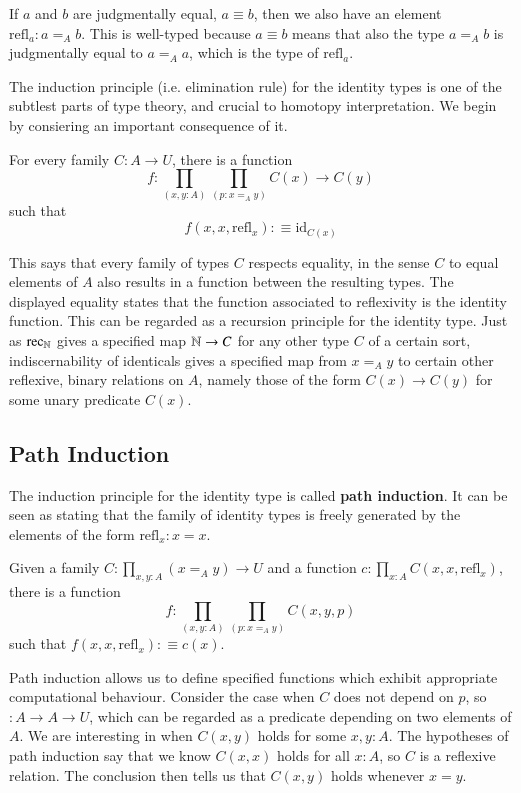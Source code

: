 If $a$ and $b$ are judgmentally equal, $a \equiv b$, then we also have an element $\text{refl}_a: a=_Ab$. This is well-typed because $a \equiv b$ means that also the type $a =_A b$ is judgmentally equal to $a =_Aa$, which is the type of $\text{refl}_a$.

The induction principle (i.e. elimination rule) for the identity types is one of the subtlest parts of type theory, and crucial to homotopy interpretation. We begin by consiering an important consequence of it.

\begin{theorem}
    For every family $C:A\rightarrow U$, there is a function $$f:\prod_{(x,y:A)}\prod_{(p:x=_Ay)}C(x)\rightarrow C(y)$$
    such that $$f(x,x,\text{refl}_x) :\equiv \text{id}_{C(x)}$$
\end{theorem}

This says that every family of types $C$ respects equality, in the sense $C$ to equal elements of $A$ also results in a function between the resulting types. The displayed equality states that the function associated to reflexivity is the identity function. This can be regarded as a recursion principle for the identity type. Just as $\text{rec}_{\mathbb N}$ gives a specified map $\mathbb N\rightarrow C$ for any other type $C$ of a certain sort, indiscernability of identicals gives a specified map from $x=_Ay$ to certain other reflexive, binary relations on $A$, namely those of the form $C(x)\rightarrow C(y)$ for some unary predicate $C(x)$.

\subsection{Path Induction}

The induction principle for the identity type is called \textbf{path induction}. It can be seen as stating that the family of identity types is freely generated by the elements of the form $\text{refl}_x:x=x$.

\begin{definition}
    Given a family $C:\prod_{x,y:A}(x=_Ay)\rightarrow U$ and a function $c:\prod_{x:A}C(x,x,\text{refl}_x)$, there is a function $$f:\prod_{(x,y:A)}\prod_{(p:x=_Ay)}C(x,y,p)$$
    such that $f(x,x,\text{refl}_x):\equiv c(x)$.
\end{definition}

Path induction allows us to define specified functions which exhibit appropriate computational behaviour. Consider the case when $C$ does not depend on $p$, so $:A\rightarrow A\rightarrow U$, which can be regarded as a predicate depending on two elements of $A$. We are interesting in when $C(x,y)$ holds for some $x,y:A$. The hypotheses of path induction say that we know $C(x,x)$ holds for all $x:A$, so $C$ is a reflexive relation. The conclusion then tells us that $C(x,y)$ holds whenever $x=y$.

